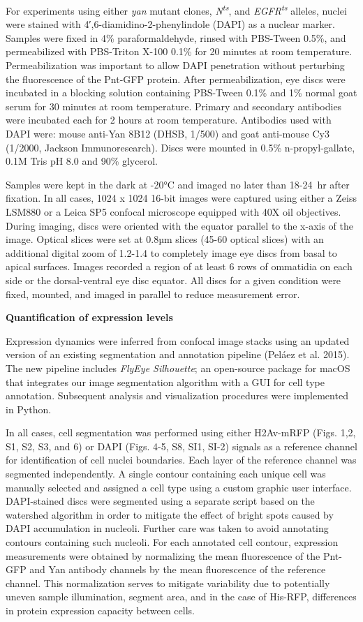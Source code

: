 For experiments using either \emph{yan} mutant clones, \emph{N\textsuperscript{ts}}, and \emph{EGFR\textsuperscript{ts}} alleles, nuclei were stained with 4′,6-diamidino-2-phenylindole (DAPI) as a nuclear marker. Samples were fixed in 4\% paraformaldehyde, rinsed with PBS-Tween 0.5\%, and permeabilized with PBS-Triton X-100 0.1\% for 20 minutes at room temperature. Permeabilization was important to allow DAPI penetration without perturbing the fluorescence of the Pnt-GFP protein. After permeabilization, eye discs were incubated in a blocking solution containing PBS-Tween 0.1\% and 1\% normal goat serum for 30 minutes at room temperature. Primary and secondary antibodies were incubated each for 2 hours at room temperature. Antibodies used with DAPI were: mouse anti-Yan 8B12 (DHSB, 1/500) and goat anti-mouse Cy3 (1/2000, Jackson Immunoresearch). Discs were mounted in 0.5\% n-propyl-gallate, 0.1M Tris pH 8.0 and 90\% glycerol.

Samples were kept in the dark at -20°C and imaged no later than 18-24~hr after fixation. In all cases, 1024 x 1024 16-bit images were captured using either a Zeiss LSM880 or a Leica SP5 confocal microscope equipped with 40X oil objectives. During imaging, discs were oriented with the equator parallel to the x-axis of the image. Optical slices were set at 0.8µm slices (45-60 optical slices) with an additional digital zoom of 1.2-1.4 to completely image eye discs from basal to apical surfaces. Images recorded a region of at least 6 rows of ommatidia on each side or the dorsal-ventral eye disc equator. All discs for a given condition were fixed, mounted, and imaged in parallel to reduce measurement error.

\textbf{Quantification of expression levels}

Expression dynamics were inferred from confocal image stacks using an updated version of an existing segmentation and annotation pipeline (Peláez et al. 2015). The new pipeline includes \emph{FlyEye Silhouette}; an open-source package for macOS that integrates our image segmentation algorithm with a GUI for cell type annotation. Subsequent analysis and visualization procedures were implemented in Python.

In all cases, cell segmentation was performed using either H2Av-mRFP (Figs. 1,2, S1, S2, S3, and 6) or DAPI (Figs. 4-5, S8, SI1, SI-2) signals as a reference channel for identification of cell nuclei boundaries. Each layer of the reference channel was segmented independently. A single contour containing each unique cell was manually selected and assigned a cell type using a custom graphic user interface. DAPI-stained discs were segmented using a separate script based on the watershed algorithm in order to mitigate the effect of bright spots caused by DAPI accumulation in nucleoli. Further care was taken to avoid annotating contours containing such nucleoli. For each annotated cell contour, expression measurements were obtained by normalizing the mean fluorescence of the Pnt-GFP and Yan antibody channels by the mean fluorescence of the reference channel. This normalization serves to mitigate variability due to potentially uneven sample illumination, segment area, and in the case of His-RFP, differences in protein expression capacity between cells.

